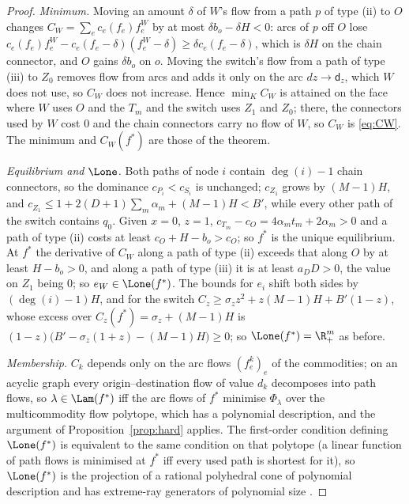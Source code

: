 \begin{proof}
\emph{Minimum.} Moving an amount $\delta$ of $W$'s flow from a path $p$ of type (ii) to $O$ changes $C_W=\sum_ec_e(f_e)f^W_e$ by at most $\delta b_o-\delta H<0$: arcs of $p$ off $O$ lose $c_e(f_e)f^W_e-c_e(f_e-\delta)(f^W_e-\delta)\ge\delta c_e(f_e-\delta)$, which is $\delta H$ on the chain connector, and $O$ gains $\delta b_o$ on $o$. Moving the switch's flow from a path of type (iii) to $Z_0$ removes flow from arcs and adds it only on the arc $dz\to\mathsf d_z$, which $W$ does not use, so $C_W$ does not increase. Hence $\min_KC_W$ is attained on the face where $W$ uses $O$ and the $T_m$ and the switch uses $Z_1$ and $Z_0$; there, the connectors used by $W$ cost $0$ and the chain connectors carry no flow of $W$, so $C_W$ is \eqref{eq:CW}. The minimum and $C_W(f^*)$ are those of the theorem.

\emph{Equilibrium and $\Lone$.} Both paths of node $i$ contain $\deg(i)-1$ chain connectors, so the dominance $c_{P_i}<c_{S_i}$ is unchanged; $c_{Z_1}$ grows by $(M-1)H$, and $c_{Z_1}\le1+2(D+1)\sum_m\alpha_m+(M-1)H<B'$, while every other path of the switch contains $q_0$. Given $x=0$, $z=1$, $c_{T_m}-c_O=4\alpha_mt_m+2\alpha_m>0$ and a path of type (ii) costs at least $c_O+H-b_o>c_O$; so $f^*$ is the unique equilibrium. At $f^*$ the derivative of $C_W$ along a path of type (ii) exceeds that along $O$ by at least $H-b_o>0$, and along a path of type (iii) it is at least $a_DD>0$, the value on $Z_1$ being $0$; so $e_W\in\Lone(f^*)$. The bounds for $e_i$ shift both sides by $(\deg(i)-1)H$, and for the switch $C_z\ge\sigma_zz^2+z(M-1)H+B'(1-z)$, whose excess over $C_z(f^*)=\sigma_z+(M-1)H$ is $(1-z)\big(B'-\sigma_z(1+z)-(M-1)H\big)\ge0$; so $\Lone(f^*)=\R^m_+$ as before.

\emph{Membership.} $C_k$ depends only on the arc flows $(f^k_e)_{e}$ of the commodities; on an acyclic graph every origin--destination flow of value $d_k$ decomposes into path flows, so $\lambda\in\Lam(f^*)$ iff the arc flows of $f^*$ minimise $\Phi_\lambda$ over the multicommodity flow polytope, which has a polynomial description, and the argument of Proposition~\ref{prop:hard} applies. The first-order condition defining $\Lone(f^*)$ is equivalent to the same condition on that polytope (a linear function of path flows is minimised at $f^*$ iff every used path is shortest for it), so $\Lone(f^*)$ is the projection of a rational polyhedral cone of polynomial description and has extreme-ray generators of polynomial size \citep[Ch.~10]{schrijver1986}.
\end{proof}

